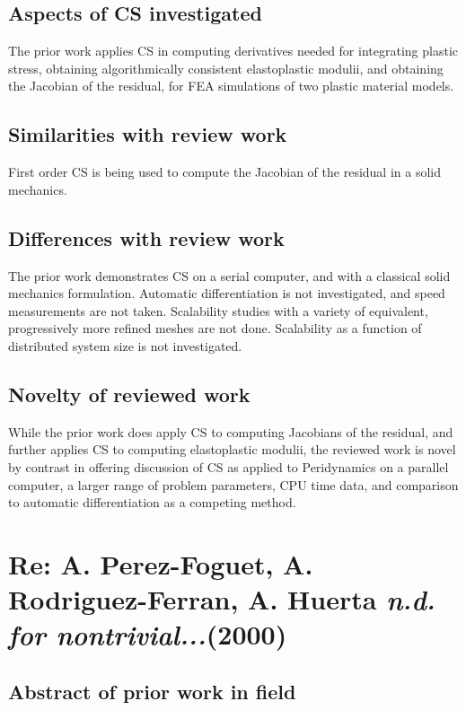 \documentclass[10pt,letterpaper,draft]{article}
\begin{document}
\subsection{Aspects of CS investigated}

The prior work applies CS in computing derivatives needed for integrating
plastic stress, obtaining algorithmically consistent elastoplastic modulii, and
obtaining the Jacobian of the residual, for FEA simulations of two plastic
material models.

\subsection{Similarities with review work}

First order CS is being used to compute the Jacobian of the residual in a solid mechanics.

\subsection{Differences with review work}

The prior work demonstrates CS on a serial computer, and with a classical solid mechanics
formulation. Automatic differentiation is not investigated, and speed measurements are
not taken. Scalability studies with a variety of equivalent, progressively more refined meshes
are not done. Scalability as a function of distributed system size is not investigated.

\subsection{Novelty of reviewed work}

While the prior work does apply CS to computing Jacobians of the residual, and further applies CS
to computing elastoplastic modulii, the reviewed work is novel by contrast in offering discussion
of CS as applied to Peridynamics on a parallel computer, a larger range of problem parameters, 
CPU time data, and comparison to automatic differentiation as a competing method. 

\section{Re: A. Perez-Foguet, A. Rodriguez-Ferran, A. Huerta \emph{n.d. for nontrivial...}(2000)}
\subsection{Abstract of prior work in field}
\end{document}
